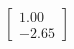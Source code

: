 \documentclass[preview]{standalone}
\begin{document}
\begin{align*}
\begin{bmatrix} 1.00 \\ -2.65 \end{bmatrix}
\end{align*}
\end{document}

